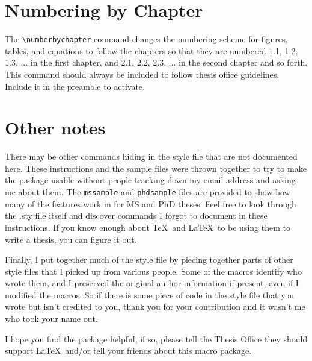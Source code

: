 \documentclass[11pt]{article}
\begin{document}
\begin{singlespace}
\section*{Numbering by Chapter}

The \verb+\numberbychapter+ command changes the numbering scheme for figures,
tables, and equations to follow the chapters so that they are numbered 1.1,
1.2, 1.3, ... in the first chapter, and 2.1, 2.2, 2.3, ... in the second
chapter and so forth.  This command should always be included to follow thesis
office guidelines.  Include it in the preamble to activate.


\section*{Other notes}

There may be other commands hiding in the style file that are not documented
here.  These instructions and the sample files were thrown together to try to
make the package usable without people tracking down my email address and asking
me about them.  The \verb+mssample+ and \verb+phdsample+ files are provided to
show how many of the features work in for MS and PhD theses.  Feel free to look
through the .sty file itself and discover commands I forgot to document in these
instructions.  If you know enough about \TeX\ and \LaTeX\ to be using them to
write a thesis, you can figure it out.

Finally, I put together much of the style file by piecing together parts of
other style files that I picked up from various people.  Some of the macros
identify who wrote them, and I preserved the original author information if
present, even if I modified the macros.  So if there is some piece of code in
the style file that you wrote but isn't credited to you, thank you for your
contribution and it wasn't me who took your name out.

I hope you find the package helpful, if so, please tell the Thesis Office they
should support \LaTeX\ and/or tell your friends about this macro package.

\end{singlespace}
\end{document}

